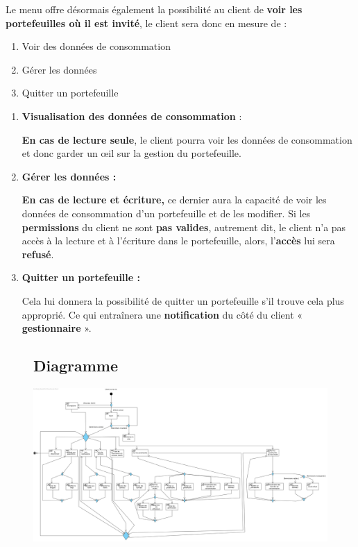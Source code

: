 \newpage

\begin{flushleft}
Le menu offre désormais également la possibilité au client de \textbf{voir les portefeuilles où il est invité}, le client sera donc en mesure de :
\end{flushleft}

\begin{enumerate}[1.]
\item Voir des données de consommation
\item Gérer les données
\item Quitter un portefeuille
\end{enumerate}

\begin{enumerate}[-]
\item \textbf{Visualisation des données de consommation} :

\textbf{En cas de lecture seule}, le client pourra voir les données de consommation et donc garder un œil sur la gestion du portefeuille.

\item \textbf{Gérer les données :}

\textbf{En cas de lecture et écriture,} ce dernier aura la capacité de voir les données de consommation d’un portefeuille et de les modifier.
\newline
Si les \textbf{permissions} du client ne sont \textbf{pas valides}, autrement dit, le client n’a pas accès à la lecture et à l’écriture dans le portefeuille, alors, l’\textbf{accès} lui sera \textbf{refusé}.

\item \textbf{Quitter un portefeuille :}

Cela lui donnera la possibilité de quitter un portefeuille s’il trouve cela plus approprié.
\newline
Ce qui entraînera une \textbf{notification} du côté du client « \textbf{gestionnaire} ».

\end{enumerate}

\begin{figure}[h]
\subsection{Diagramme}
\centering
\includegraphics[width = 1\textwidth]{Extension-claire/Overview-claire/img/overview.png}
\end{figure}